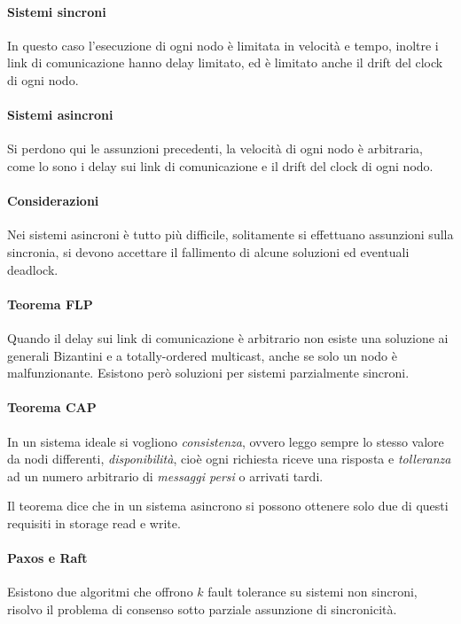 \paragraph{Sistemi sincroni}
In questo caso l'esecuzione di ogni nodo è limitata in velocità 
e tempo, inoltre i link di comunicazione hanno delay limitato, 
ed è limitato anche il drift del clock di ogni nodo.

\paragraph{Sistemi asincroni}
Si perdono qui le assunzioni precedenti, 
la velocità di ogni nodo è arbitraria, come lo sono 
i delay sui link di comunicazione e il drift del clock di ogni nodo.

\paragraph{Considerazioni}
Nei sistemi asincroni è tutto più difficile, solitamente si 
effettuano assunzioni sulla sincronia, si devono accettare 
il fallimento di alcune soluzioni ed eventuali deadlock.

\paragraph{Teorema FLP}
Quando il delay sui link di comunicazione è arbitrario 
non esiste una soluzione ai generali Bizantini e a totally-ordered
multicast, anche se solo un nodo è malfunzionante.
Esistono però soluzioni per sistemi parzialmente sincroni.

\paragraph{Teorema CAP}
In un sistema ideale si vogliono \emph{consistenza}, ovvero leggo sempre 
lo stesso valore da nodi differenti, \emph{disponibilità}, cioè ogni richiesta riceve
una risposta 
e \emph{tolleranza} ad un numero arbitrario di \emph{messaggi persi} o 
arrivati tardi.

Il teorema dice che in un sistema asincrono si possono ottenere solo due 
di questi requisiti in storage read e write.

\paragraph{Paxos e Raft}
Esistono due algoritmi che offrono $k$ fault tolerance su sistemi non sincroni, 
risolvo il problema di consenso sotto parziale assunzione di sincronicità.